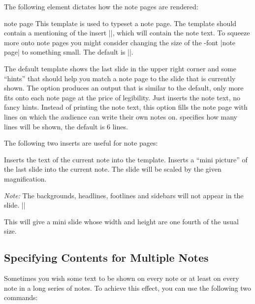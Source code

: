 The following element dictates how the note pages are rendered:

\begin{element}{note page}\yes\yes\yes
  This template is used to typeset a note page.  The template should contain a mentioning of the insert |\insertnote|, which will contain the note text. To squeeze more onto note pages you might consider changing the size of the \beamer-font |note page| to something small. The default is |\small|.
  \begin{templateoptions}
    The default template shows the last slide in the upper right corner and some ``hints'' that should help you match a note page to the slide that is currently shown.
    The option produces an output that is similar to the default, only more fits onto each note page at the price of legibility.
    Just inserts the note text, no fancy hints.
    Instead of printing the note text, this option fills the note page with lines on which the audience can write their own notes on.  specifies how many lines will be shown, the default is 6 lines.
  \end{templateoptions}
  The following two inserts are useful for note pages:
  \begin{itemize}
    \iteminsert{\insertnote}
    Inserts the text of the current note into the template.
    \iteminsert{\insertslideintonotes}
    Inserts a ``mini picture'' of the last slide into the current note. The slide will be scaled by the given magnification.

    \emph{Note:} The backgrounds, headlines, footlines and sidebars will not appear in the slide.
    \example
    ||

    This will give a mini slide whose width and height are one fourth of the usual size.
  \end{itemize}
\end{element}


\subsection{Specifying Contents for Multiple Notes}

Sometimes you wish some text to be shown on every note or at least on every note in a long series of notes. To achieve this effect, you can use the following two commands:

